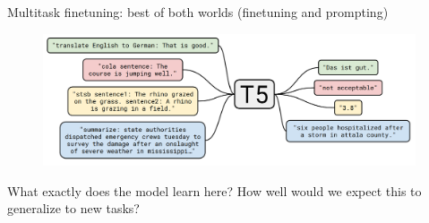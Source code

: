 \begin{frame}{Multitask finetuning: best of both worlds
(finetuning and  prompting)}

\vfill
	
	\begin{figure}
		\centering
		\includegraphics[width = 11cm]{figure/62-t5.png}\\ 
	\end{figure}

\pause

     \ques What exactly does the model learn here? How well
    would we expect this to generalize to new tasks?


\vfill

\end{frame}



